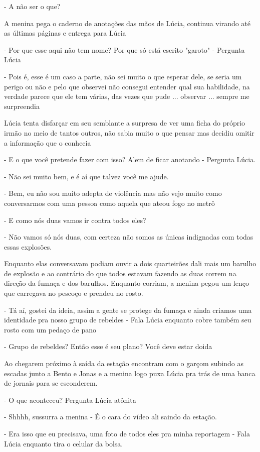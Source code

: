 - A não ser o que?

A menina pega o caderno de anotações das mãos de Lúcia, continua virando até as últimas páginas e entrega para Lúcia

- Por que esse aqui não tem nome? Por que só está escrito "garoto" - Pergunta Lúcia

- Pois é, esse é um caso a parte, não sei muito o que esperar dele, se seria um perigo ou não e pelo que observei não consegui entender qual sua habilidade, na verdade parece que ele tem várias, das vezes que pude ... observar ... sempre me surpreendia

Lúcia tenta disfarçar em seu semblante a surpresa de ver uma ficha do próprio irmão no meio de tantos outros, não sabia muito o que pensar mas decidiu omitir a informação que o conhecia

- E o que você pretende fazer com isso? Alem de ficar anotando - Pergunta Lúcia.

- Não sei muito bem, e é aí que talvez você me ajude.

- Bem, eu não sou muito adepta de violência mas não vejo muito como conversarmos com uma pessoa como aquela que ateou fogo no metrô

- E como nós duas vamos ir contra todos eles?

- Não vamos só nós duas, com certeza não somos as únicas indignadas com todas essas explosões.


Enquanto elas conversavam podiam ouvir a dois quarteirões dali mais um barulho de explosão e ao contrário do que todos estavam fazendo as duas correm na direção da fumaça e dos barulhos.
Enquanto corriam, a menina pegou um lenço que carregava no pescoço e prendeu no rosto.

- Tá aí, gostei da ideia, assim a gente se protege da fumaça e ainda criamos uma identidade pra nosso grupo de rebeldes - Fala Lúcia enquanto cobre também seu rosto com um pedaço de pano

- Grupo de rebeldes? Então esse é seu plano? Você deve estar doida

Ao chegarem próximo à saída da estação encontram com o garçom subindo as escadas junto a Bento e Jonas e a menina logo puxa Lúcia pra trás de uma banca de jornais para se esconderem.

- O que aconteceu? Pergunta Lúcia atônita

- Shhhh, sussurra a menina - É o cara do vídeo ali saindo da estação.

- Era isso que eu precisava, uma foto de todos eles pra minha reportagem - Fala Lúcia enquanto tira o celular da bolsa.

